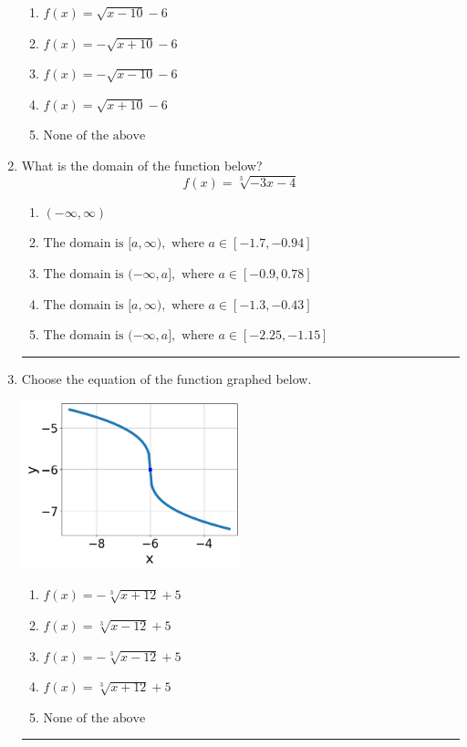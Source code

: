 \documentclass[14pt]{extbook}
\newcommand{\litem}[1]{\item#1\hspace*{-1cm}\rule{\textwidth}{0.4pt}}
\begin{document}
\begin{enumerate}
{\begin{center}
\end{center}
\begin{enumerate}[label=\Alph*.]
\item \( f(x) = \sqrt{x - 10} - 6 \)
\item \( f(x) = - \sqrt{x + 10} - 6 \)
\item \( f(x) = - \sqrt{x - 10} - 6 \)
\item \( f(x) = \sqrt{x + 10} - 6 \)
\item \( \text{None of the above} \)

\end{enumerate} }
\litem{
What is the domain of the function below?\[ f(x) = \sqrt[3]{-3 x - 4} \]\begin{enumerate}[label=\Alph*.]
\item \( (-\infty, \infty) \)
\item \( \text{The domain is } [a, \infty), \text{   where } a \in [-1.7, -0.94] \)
\item \( \text{The domain is } (-\infty, a], \text{   where } a \in [-0.9, 0.78] \)
\item \( \text{The domain is } [a, \infty), \text{   where } a \in [-1.3, -0.43] \)
\item \( \text{The domain is } (-\infty, a], \text{   where } a \in [-2.25, -1.15] \)

\end{enumerate} }
\litem{
Choose the equation of the function graphed below.
\begin{center}
    \includegraphics[width=0.5\textwidth]{../Figures/radicalGraphToEquationB.png}
\end{center}
\begin{enumerate}[label=\Alph*.]
\item \( f(x) = - \sqrt[3]{x + 12} + 5 \)
\item \( f(x) = \sqrt[3]{x - 12} + 5 \)
\item \( f(x) = - \sqrt[3]{x - 12} + 5 \)
\item \( f(x) = \sqrt[3]{x + 12} + 5 \)
\item \( \text{None of the above} \)


\end{enumerate}}
\end{enumerate}
\end{document}
